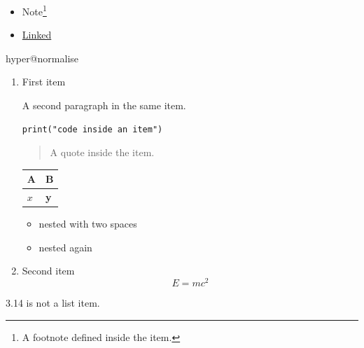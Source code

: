 \begin{itemize}
\item Note\footnote{\label{mark2tex:footnote:88cf43d55c883d1c1357c8dc91ca7f8d:1}A footnote defined inside the item.}
\item \href{\detokenize{https://example.org}}{Linked}
\end{itemize}
\ifcsname hyper@normalise\endcsname\else\PackageError{mark2tex}{Markdown links require hyperref}{Load \string\usepackage{hyperref} in the document preamble.}\fi
\begin{enumerate}
\item First item

A second paragraph in the same item.

\begin{verbatim}
print("code inside an item")
\end{verbatim}

\begin{quote}
A quote inside the item.
\end{quote}

\par\addvspace{\medskipamount}
\noindent\begin{tabularx}{\linewidth}{@{}>{\raggedright\arraybackslash}X>{\raggedright\arraybackslash}X@{}}
\toprule
A & B \\
\midrule
$x$ & \textbf{y} \\
\bottomrule
\end{tabularx}
\par\addvspace{\medskipamount}
\begin{itemize}
\item nested with two spaces
\item nested again
\end{itemize}
\item Second item
\[
E = mc^2
\]
\end{enumerate}
3.14 is not a list item.

